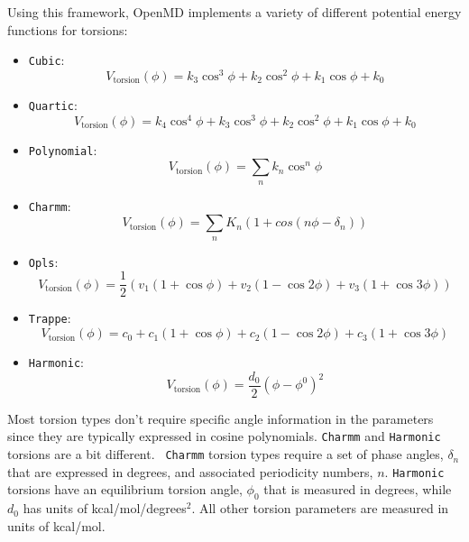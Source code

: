 \documentclass[letterpaper]{report}
\begin{document}
Using this framework, OpenMD implements a variety of different
potential energy functions for torsions:
\begin{itemize}
\item {\tt Cubic}:
\begin{equation*}
  V_{\text{torsion}}(\phi) =  
  k_3 \cos^3 \phi + k_2 \cos^2 \phi + k_1 \cos \phi + k_0
\end{equation*}
\item {\tt Quartic}:
\begin{equation*}
  V_{\text{torsion}}(\phi) =  k_4 \cos^4 \phi + 
  k_3 \cos^3 \phi + k_2 \cos^2 \phi + k_1 \cos \phi + k_0
\end{equation*}
\item {\tt Polynomial}:
\begin{equation*}
V_{\text{torsion}}(\phi) =  \sum_n k_n \cos^n \phi 
\end{equation*}
\item {\tt Charmm}:
\begin{equation*}
V_{\text{torsion}}(\phi) = \sum_n K_n \left( 1 + cos(n
  \phi - \delta_n) \right)
\end{equation*}
\item {\tt Opls}:
\begin{equation*}
  V_{\text{torsion}}(\phi) =  \frac{1}{2} \left(v_1 (1 + \cos \phi)
    + v_2 (1 - \cos 2 \phi) +  v_3 (1 + \cos 3 \phi)  \right)
\end{equation*}
\item {\tt Trappe}:\cite{Siepmann1998}
\begin{equation*}
  V_{\text{torsion}}(\phi) =  c_0 + c_1 (1 + \cos \phi) + c_2 (1 - \cos 2 \phi)  +
  c_3 (1 + \cos 3 \phi)
\end{equation*}
\item {\tt Harmonic}:
\begin{equation*}
V_{\text{torsion}}(\phi) =  \frac{d_0}{2} \left(\phi - \phi^0\right)^2
\end{equation*}
\end{itemize}

Most torsion types don't require specific angle information in the
parameters since they are typically expressed in cosine polynomials.
{\tt Charmm} and {\tt Harmonic} torsions are a bit different.  {\tt
  Charmm} torsion types require a set of phase angles, $\delta_n$ that
are expressed in degrees, and associated periodicity numbers, $n$.
{\tt Harmonic} torsions have an equilibrium torsion angle, $\phi_0$
that is measured in degrees, while $d_0$ has units of
kcal/mol/degrees$^2$.  All other torsion parameters are measured in
units of kcal/mol.
\end{document}
